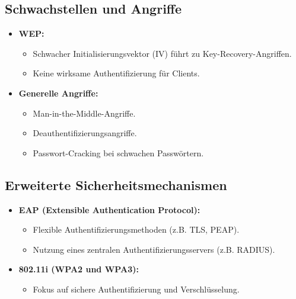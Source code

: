 \documentclass{article}
\begin{document}
\subsection{Schwachstellen und Angriffe}
\begin{itemize}
    \item \textbf{WEP:}
    \begin{itemize}
        \item Schwacher Initialisierungsvektor (IV) führt zu Key-Recovery-Angriffen.
        \item Keine wirksame Authentifizierung für Clients.
    \end{itemize}
    \item \textbf{Generelle Angriffe:}
    \begin{itemize}
        \item Man-in-the-Middle-Angriffe.
        \item Deauthentifizierungsangriffe.
        \item Passwort-Cracking bei schwachen Passwörtern.
    \end{itemize}
\end{itemize}

\subsection{Erweiterte Sicherheitsmechanismen}
\begin{itemize}
    \item \textbf{EAP (Extensible Authentication Protocol):}
    \begin{itemize}
        \item Flexible Authentifizierungsmethoden (z.B. TLS, PEAP).
        \item Nutzung eines zentralen Authentifizierungsservers (z.B. RADIUS).
    \end{itemize}
    \item \textbf{802.11i (WPA2 und WPA3):}
    \begin{itemize}
        \item Fokus auf sichere Authentifizierung und Verschlüsselung.
    \end{itemize}
\end{itemize}
\end{document}
